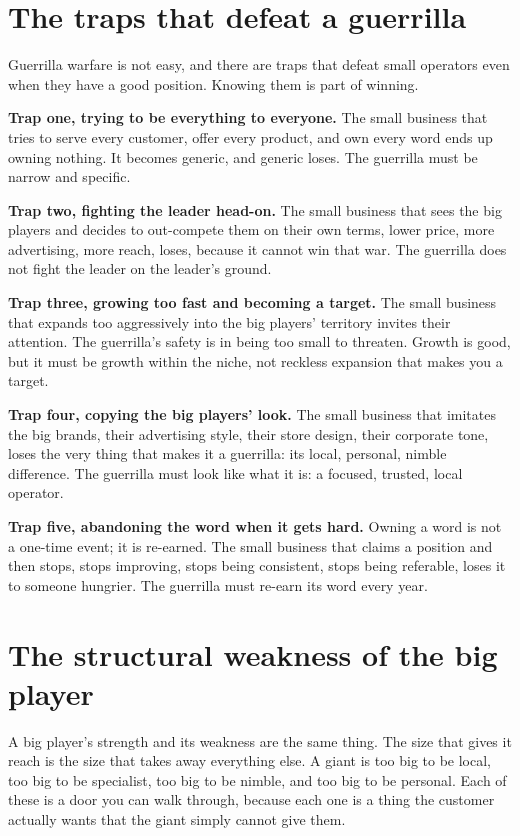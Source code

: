 \documentclass[10pt,twoside,openany]{memoir}
\newcommand{\needspacehead}{\needspace{4\baselineskip}}
\let\oldsection\section
\renewcommand{\section}{\needspacehead\oldsection}
\begin{document}
{\section{The traps that defeat a
guerrilla}\label{the-traps-that-defeat-a-guerrilla}

Guerrilla warfare is not easy, and there are traps that defeat small
operators even when they have a good position. Knowing them is part of
winning.

\textbf{Trap one, trying to be everything to everyone.} The small
business that tries to serve every customer, offer every product, and
own every word ends up owning nothing. It becomes generic, and generic
loses. The guerrilla must be narrow and specific.

\textbf{Trap two, fighting the leader head-on.} The small business that
sees the big players and decides to out-compete them on their own terms,
lower price, more advertising, more reach, loses, because it cannot win
that war. The guerrilla does not fight the leader on the leader's
ground.

\textbf{Trap three, growing too fast and becoming a target.} The small
business that expands too aggressively into the big players' territory
invites their attention. The guerrilla's safety is in being too small to
threaten. Growth is good, but it must be growth within the niche, not
reckless expansion that makes you a target.

\textbf{Trap four, copying the big players' look.} The small business
that imitates the big brands, their advertising style, their store
design, their corporate tone, loses the very thing that makes it a
guerrilla: its local, personal, nimble difference. The guerrilla must
look like what it is: a focused, trusted, local operator.

\textbf{Trap five, abandoning the word when it gets hard.} Owning a word
is not a one-time event; it is re-earned. The small business that claims
a position and then stops, stops improving, stops being consistent,
stops being referable, loses it to someone hungrier. The guerrilla must
re-earn its word every year.

\section{The structural weakness of the big
player}\label{the-structural-weakness-of-the-big-player}

A big player's strength and its weakness are the same thing. The size
that gives it reach is the size that takes away everything else. A giant
is too big to be local, too big to be specialist, too big to be nimble,
and too big to be personal. Each of these is a door you can walk
through, because each one is a thing the customer actually wants that
the giant simply cannot give them.

}
\end{document}
